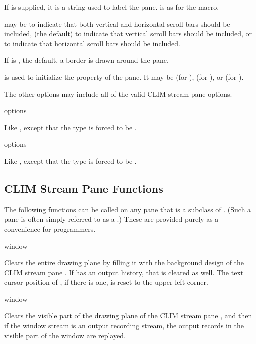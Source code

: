 If  is supplied, it is a string used to label the pane.
 is as for the  macro.

 may be  to indicate that both vertical and horizontal
scroll bars should be included,  (the default) to indicate that
vertical scroll bars should be included, or  to indicate that
horizontal scroll bars should be included.

If  is , the default, a border is drawn around the pane.

 is used to initialize the 
property of the pane.  It may be  (for ),
 (for ), or  (for
).

The other options may include all of the valid CLIM stream pane options.

 {\rest options}

Like , except that the type is forced to be
.

 {\rest options}

Like , except that the type is forced to be
.


\subsection {CLIM Stream Pane Functions}

The following functions can be called on any pane that is a subclass of
.  (Such a pane is often simply referred to as a
.)  These are provided purely as a convenience for programmers.

 {window}

Clears the entire drawing plane by filling it with the background design of the
CLIM stream pane .  If  has an output history, that is
cleared as well.  The text cursor position of , if there is one, is
reset to the upper left corner.

 {window}

Clears the visible part of the drawing plane of the CLIM stream pane
, and then if the window stream is an output recording stream, the
output records in the visible part of the window are replayed.

